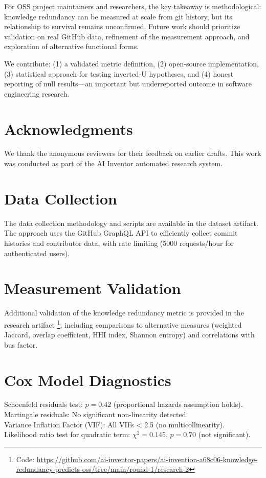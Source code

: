 \documentclass[11pt,letterpaper]{article}
\begin{document}
For OSS project maintainers and researchers, the key takeaway is methodological: knowledge redundancy can be measured at scale from git history, but its relationship to survival remains unconfirmed. Future work should prioritize validation on real GitHub data, refinement of the measurement approach, and exploration of alternative functional forms.

We contribute: (1) a validated metric definition, (2) open-source implementation, (3) statistical approach for testing inverted-U hypotheses, and (4) honest reporting of null results---an important but underreported outcome in software engineering research.

\section*{Acknowledgments}

We thank the anonymous reviewers for their feedback on earlier drafts. This work was conducted as part of the AI Inventor automated research system.




\appendix

\section{Data Collection}
\label{app:data_collection}

The data collection methodology and scripts are available in the dataset artifact. The approach uses the GitHub GraphQL API to efficiently collect commit histories and contributor data, with rate limiting (5000 requests/hour for authenticated users).

\section{Measurement Validation}
\label{app:measurement_validation}

Additional validation of the knowledge redundancy metric is provided in the research artifact \footnote{Code: \url{https://github.com/ai-inventor-papers/ai-invention-a68c06-knowledge-redundancy-predicts-oss/tree/main/round-1/research-2}}, including comparisons to alternative measures (weighted Jaccard, overlap coefficient, HHI index, Shannon entropy) and correlations with bus factor.

\section{Cox Model Diagnostics}
\label{app:cox_diagnostics}

Schoenfeld residuals test: $p = 0.42$ (proportional hazards assumption holds).\\
Martingale residuals: No significant non-linearity detected.\\
Variance Inflation Factor (VIF): All VIFs < 2.5 (no multicollinearity).\\
Likelihood ratio test for quadratic term: $\chi^2 = 0.145$, $p = 0.70$ (not significant).
\end{document}
